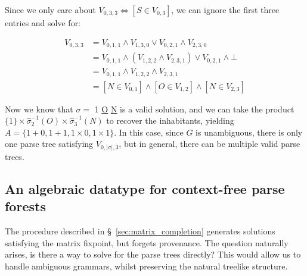 \documentclass[sigplan,review,acmsmall,nonacm,anonymous]{acmart}\settopmatter{printfolios=false,printccs=false,printacmref=false}
\begin{document}
  \noindent Since we only care about $V_{0, 3, 3} \Leftrightarrow [S \in V_{0, 3}]$, we can ignore the first three entries and solve for:

  \begin{align*}
    V_{0, 3, 3} &= V_{0, 1, 1} \land V_{1, 3, 0} \lor V_{0, 2, 1} \land V_{2, 3, 0}\\
    &= V_{0, 1, 1} \land (V_{1, 2, 2} \land V_{2, 3, 1}) \lor V_{0, 2, 1} \land \bot\\
    &= V_{0, 1, 1} \land V_{1, 2, 2} \land V_{2, 3, 1}\\
    &= [N \in V_{0, 1}] \land [O \in V_{1, 2}] \land [N \in V_{2, 3}]
  \end{align*}

  Now we know that $\sigma =$ 1 \underline{O} \underline{N} is a valid solution, and we can take the product $\{1\}\times \hat\sigma_2^{-1}(O) \times \hat\sigma_3^{-1}(N)$ to recover the inhabitants, yielding $A=\{1+0, 1+1, 1\times 0, 1\times 1\}$. In this case, since $G$ is unambiguous, there is only one parse tree satisfying $V_{0, |\sigma|, 3}$, but in general, there can be multiple valid parse trees.

  \subsection{An algebraic datatype for context-free parse forests}\label{sec:ptree}

  The procedure described in \S~\ref{sec:matrix_completion} generates solutions satisfying the matrix fixpoint, but forgets provenance. The question naturally arises, is there a way to solve for the parse trees directly? This would allow us to handle ambiguous grammars, whilst preserving the natural treelike structure.
\end{document}
